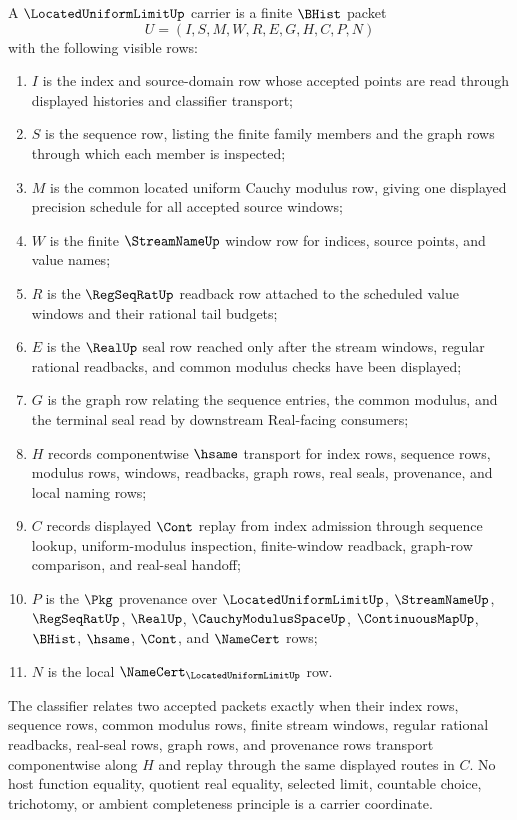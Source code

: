 \begin{definition}
\label{def:located-uniform-limit-carrier}
A $\LocatedUniformLimitUp$ carrier is a finite $\BHist$ packet
$$
U=(I,S,M,W,R,E,G,H,C,P,N)
$$
with the following visible rows:
\begin{enumerate}
\item $I$ is the index and source-domain row whose accepted points are read
  through displayed histories and classifier transport;
\item $S$ is the sequence row, listing the finite family members and the
  graph rows through which each member is inspected;
\item $M$ is the common located uniform Cauchy modulus row, giving one
  displayed precision schedule for all accepted source windows;
\item $W$ is the finite $\StreamNameUp$ window row for indices, source
  points, and value names;
\item $R$ is the $\RegSeqRatUp$ readback row attached to the scheduled value
  windows and their rational tail budgets;
\item $E$ is the $\RealUp$ seal row reached only after the stream windows,
  regular rational readbacks, and common modulus checks have been displayed;
\item $G$ is the graph row relating the sequence entries, the common modulus,
  and the terminal seal read by downstream Real-facing consumers;
\item $H$ records componentwise $\hsame$ transport for index rows, sequence
  rows, modulus rows, windows, readbacks, graph rows, real seals, provenance,
  and local naming rows;
\item $C$ records displayed $\Cont$ replay from index admission through
  sequence lookup, uniform-modulus inspection, finite-window readback,
  graph-row comparison, and real-seal handoff;
\item $P$ is the $\Pkg$ provenance over $\LocatedUniformLimitUp$,
  $\StreamNameUp$, $\RegSeqRatUp$, $\RealUp$, $\CauchyModulusSpaceUp$,
  $\ContinuousMapUp$, $\BHist$, $\hsame$, $\Cont$, and $\NameCert$ rows;
\item $N$ is the local $\NameCert_{\LocatedUniformLimitUp}$ row.
\end{enumerate}
The classifier relates two accepted packets exactly when their index rows,
sequence rows, common modulus rows, finite stream windows, regular rational
readbacks, real-seal rows, graph rows, and provenance rows transport
componentwise along $H$ and replay through the same displayed routes in $C$.
No host function equality, quotient real equality, selected limit, countable
choice, trichotomy, or ambient completeness principle is a carrier coordinate.
\end{definition}

